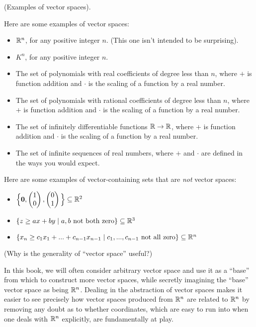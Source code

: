 \begin{remark}
    (Examples of vector spaces).
    
    Here are some examples of vector spaces:
    
    \begin{itemize}
        \item $\mathbb{R}^n$, for any positive integer $n$. (This one isn't intended to be surprising).
        \item $K^n$, for any positive integer $n$.
        \item The set of polynomials with real coefficients of degree less than $n$, where $+$ is function addition and $\cdot$ is the scaling of a function by a real number.
        \item The set of polynomials with rational coefficients of degree less than $n$, where $+$ is function addition and $\cdot$ is the scaling of a function by a real number.
        \item The set of infinitely differentiable functions $\mathbb{R} \rightarrow \mathbb{R}$, where $+$ is function addition and $\cdot$ is the scaling of a function by a real number.
        \item The set of infinite sequences of real numbers, where $+$ and $\cdot$ are defined in the ways you would expect.
    \end{itemize}
    
    Here are some examples of vector-containing sets that are \textit{not} vector spaces:
    
    \begin{itemize}
        \item $\Big\{ \mathbf{0}, \begin{pmatrix} 1 \\ 0 \end{pmatrix}, \begin{pmatrix} 0 \\ 1 \end{pmatrix} \Big\} \subseteq \mathbb{R}^2$
        \item $\{ z \geq ax + by \mid \text{$a, b$ not both zero} \} \subseteq \mathbb{R}^3$
        \item $\{ x_n \geq c_1 x_1 + ... + c_{n - 1} x_{n - 1} \mid \text{$c_1, ..., c_{n - 1}$ not all zero}\} \subseteq \mathbb{R}^n$
    \end{itemize}
\end{remark}

\begin{remark}
    (Why is the generality of ``vector space'' useful?)
    
    In this book, we will often consider arbitrary vector space and use it as a ``base'' from which to construct more vector spaces, while secretly imagining the ``base'' vector space as being $\mathbb{R}^n$. Dealing in the abstraction of vector spaces makes it easier to see precisely how vector spaces produced from $\mathbb{R}^n$ are related to $\mathbb{R}^n$ by removing any doubt as to whether coordinates, which are easy to run into when one deals with $\mathbb{R}^n$ explicitly, are fundamentally at play.
\end{remark}


